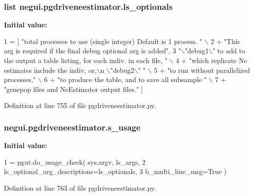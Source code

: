 \subsubsection[{\texorpdfstring{ls\+\_\+optionals}{ls_optionals}}]{\setlength{\rightskip}{0pt plus 5cm}list negui.\+pgdriveneestimator.\+ls\+\_\+optionals}\hypertarget{namespacenegui_1_1pgdriveneestimator_acb78e64cb6ac8c5250cf2aa717946c61}{}\label{namespacenegui_1_1pgdriveneestimator_acb78e64cb6ac8c5250cf2aa717946c61}
{\bfseries Initial value\+:}
\begin{DoxyCode}
1 = [ \textcolor{stringliteral}{"total processes to use (single integer) Default is 1 process.  "} \(\backslash\)
2             + \textcolor{stringliteral}{"This arg is required if the final debug optional arg is added"},
3             \textcolor{stringliteral}{"\(\backslash\)"debug1\(\backslash\)" to add to the output a table listing, for each indiv. in each file, "} \(\backslash\)
4                     + \textcolor{stringliteral}{"which replicate Ne estimates include the indiv, or,\(\backslash\)n \(\backslash\)"debug2\(\backslash\)" "} \(\backslash\)
5                     + \textcolor{stringliteral}{"to run without parallelized processes,"} \(\backslash\)
6                     + \textcolor{stringliteral}{"to produce the table, and to save all subsample "} \(\backslash\)
7                     + \textcolor{stringliteral}{"genepop files and NeEstimator output files."} ]
\end{DoxyCode}


Definition at line 755 of file pgdriveneestimator.\+py.

\subsubsection[{\texorpdfstring{s\+\_\+usage}{s_usage}}]{\setlength{\rightskip}{0pt plus 5cm}negui.\+pgdriveneestimator.\+s\+\_\+usage}\hypertarget{namespacenegui_1_1pgdriveneestimator_a147253c79bbe39eef5bc01233bda5ab7}{}\label{namespacenegui_1_1pgdriveneestimator_a147253c79bbe39eef5bc01233bda5ab7}
{\bfseries Initial value\+:}
\begin{DoxyCode}
1 = pgut.do\_usage\_check( sys.argv, ls\_args, 
2             ls\_optional\_arg\_descriptions=ls\_optionals,
3             b\_multi\_line\_msg=\textcolor{keyword}{True} )
\end{DoxyCode}


Definition at line 763 of file pgdriveneestimator.\+py.

